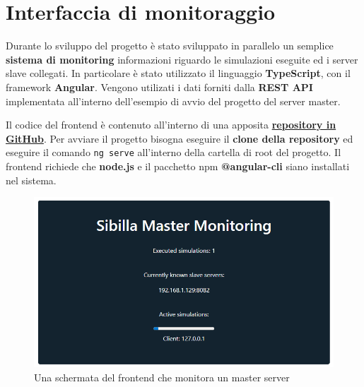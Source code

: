 \section{Interfaccia di monitoraggio}
Durante lo sviluppo del progetto è stato sviluppato in parallelo un semplice \textbf{sistema di monitoring} informazioni riguardo le simulazioni eseguite ed i server slave collegati. In particolare è stato utilizzato il linguaggio \textbf{TypeScript}, con il framework \textbf{Angular}. Vengono utilizati i dati forniti dalla \textbf{REST API} implementata all'interno dell'esempio di avvio del progetto del server master.

Il codice del frontend è contenuto all'interno di una apposita \href{https://github.com/ZamponiMarco/sibilla-frontend}{\textbf{repository in GitHub}}. Per avviare il progetto bisogna eseguire il \textbf{clone della repository} ed eseguire il comando \texttt{ng serve} all'interno della cartella di root del progetto. Il frontend richiede che \textbf{node.js} e il pacchetto npm \textbf{@angular-cli} siano installati nel sistema.

\begin{figure}[H]
    \includegraphics[width=\linewidth]{images/monitoring_frontend.PNG}
    \captionsetup{justification=centering}
    \caption{Una schermata del frontend che monitora un master server}
\end{figure}